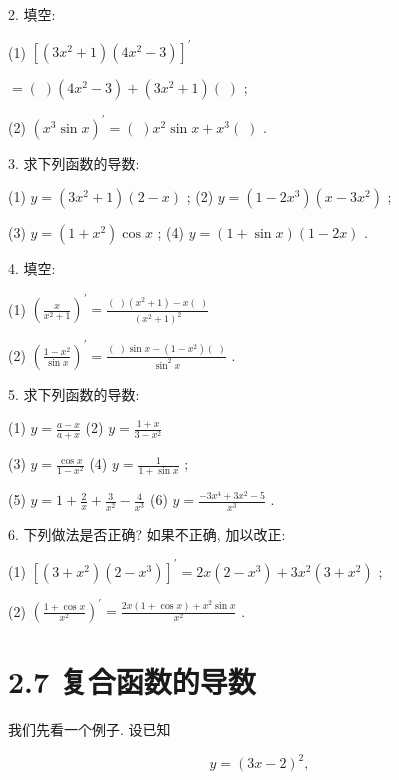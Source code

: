 \documentclass[10pt]{article}
\begin{document}
2. 填空:

(1) \({\left\lbrack \left( 3{x}^{2} + 1\right) \left( 4{x}^{2} - 3\right) \right\rbrack }^{\prime }\)

\(= \left( \;\right) \left( {4{x}^{2} - 3}\right) + \left( {3{x}^{2} + 1}\right) \left( \;\right)\) ;

(2) \({\left( {x}^{3}\sin x\right) }^{\prime } = \left( \;\right) {x}^{2}\sin x + {x}^{3}\left( \;\right)\) .

3. 求下列函数的导数:

(1) \(y = \left( {3{x}^{2} + 1}\right) \left( {2 - x}\right)\) ; (2) \(y = \left( {1 - 2{x}^{3}}\right) \left( {x - 3{x}^{2}}\right)\) ;

(3) \(y = \left( {1 + {x}^{2}}\right) \cos x\) ; (4) \(y = \left( {1 + \sin x}\right) \left( {1 - {2x}}\right)\) .

4. 填空:

(1) \({\left( \frac{x}{{x}^{2} + 1}\right) }^{\prime } = \frac{\left( \;\right) \left( {{x}^{2} + 1}\right) - x\left( \;\right) }{{\left( {x}^{2} + 1\right) }^{2}}\)

(2) \({\left( \frac{1 - {x}^{2}}{\sin x}\right) }^{\prime } = \frac{\left( \;\right) \sin x - \left( {1 - {x}^{2}}\right) \left( \;\right) }{{\sin }^{2}x}\) .

5. 求下列函数的导数:

(1) \(y = \frac{a - x}{a + x}\) (2) \(y = \frac{1 + x}{3 - {x}^{2}}\)

(3) \(y = \frac{\cos x}{1 - {x}^{2}}\) (4) \(y = \frac{1}{1 + \sin x}\) ;

(5) \(y = 1 + \frac{2}{x} + \frac{3}{{x}^{2}} - \frac{4}{{x}^{3}}\) (6) \(y = \frac{-3{x}^{4} + 3{x}^{2} - 5}{{x}^{3}}\) .

6. 下列做法是否正确? 如果不正确, 加以改正:

(1) \({\left\lbrack \left( 3 + {x}^{2}\right) \left( 2 - {x}^{3}\right) \right\rbrack }^{\prime } = {2x}\left( {2 - {x}^{3}}\right) + 3{x}^{2}\left( {3 + {x}^{2}}\right)\) ;

(2) \({\left( \frac{1 + \cos x}{{x}^{2}}\right) }^{\prime } = \frac{{2x}\left( {1 + \cos x}\right) + {x}^{2}\sin x}{{x}^{2}}\) .

\section*{2.7 复合函数的导数}

我们先看一个例子. 设已知

\[
y = {\left( 3x - 2\right) }^{2},
\]
\end{document}
